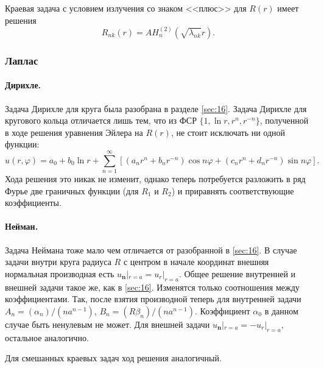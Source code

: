 
Краевая задача с условием излучения со знаком <<плюс>> для $ R(r) $ имеет
решения  
\[
  R_{nk}(r) = AH^{(2)}_n(\sqrt{\lambda_{nk}} r).
\]




\subsubsection{Лаплас}
\paragraph{Дирихле.} Задача Дирихле для круга была разобрана в разделе \ref{sec:16}. Задача Дирихле
для кругового кольца отличается лишь тем, что из ФСР $ \{1, \ln r, r^n, r^{-n}\}
$, полученной в ходе решения уравнения Эйлера на $ R(r) $, не стоит исключать ни
одной функции:
\[
  u(r,\varphi) = a_0 + b_0\ln r + \sum_{n=1}^\infty [(a_nr^n + b_nr^{-n})\cos
  n\varphi + (c_n r^n + d_n r^{-n})\sin n\varphi].
\]
Хода решения это никак не изменит, однако теперь потребуется
разложить в ряд Фурье две граничных функции (для $ R_1 $ и $ R_2 $) и приравнять
соответствующие коэффициенты.

\paragraph{Нейман.} 
Задача Неймана тоже мало чем отличается от разобранной в \ref{sec:16}. В случае задачи внутри круга радиуса $ R $ с центром
в начале координат внешняя нормальная производная есть $ u_{\mathbf n}|_{r = a}
= u_r|_{r = a}$. Общее решение внутренней и внешней задачи такое же, как в
\ref{sec:16}. Изменятся только соотношения между коэффициентами. Так, после
взятия производной теперь для
внутренней задачи $
A_n = (\alpha_n)/(na^{n-1}) $, $ B_n = (R\beta_n)/(na^{n-1}) $. Коэффициент $
\alpha_0 $ в данном случае быть ненулевым не может. Для внешней задачи $
u_{\mathbf n}|_{r=a} = -u_r|_{r=a} $, остальное аналогично.

Для смешанных краевых задач ход решения аналогичный.

